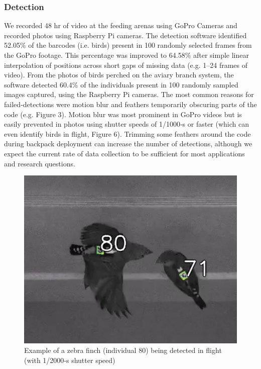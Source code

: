 \documentclass[11pt,a4paper,oneside]{article}
\begin{document}
\subsubsection{Detection}
We recorded 48 hr of video at the feeding arenas using GoPro Cameras and recorded photos using Raspberry Pi cameras. The detection software identified 52.05\% of the barcodes (i.e. birds) present in 100 randomly selected frames from the GoPro footage. This percentage was improved to 64.58\% after simple linear interpolation of positions across short gaps of missing data (e.g. 1–24 frames of video). From the photos of birds perched on the aviary branch system, the software detected 60.4\% of the individuals present in 100 randomly sampled images captured, using the Raspberry Pi cameras. The most common reasons for failed‐detections were motion blur and feathers temporarily obscuring parts of the code (e.g. Figure 3). Motion blur was most prominent in GoPro videos but is easily prevented in photos using shutter speeds of 1/1000‐s or faster (which can even identify birds in flight, Figure 6). Trimming some feathers around the code during backpack deployment can increase the number of detections, although we expect the current rate of data collection to be sufficient for most applications and research questions.

\begin{figure}
    \centering
    \includegraphics{Graving_IMPRS_Thesis/figures/bird_figure_6.jpg}
    \caption{Example of a zebra finch (individual 80) being detected in flight (with 1/2000‐s shutter speed)
}
    \label{fig:bird_figure_6}
\end{figure}
\end{document}
